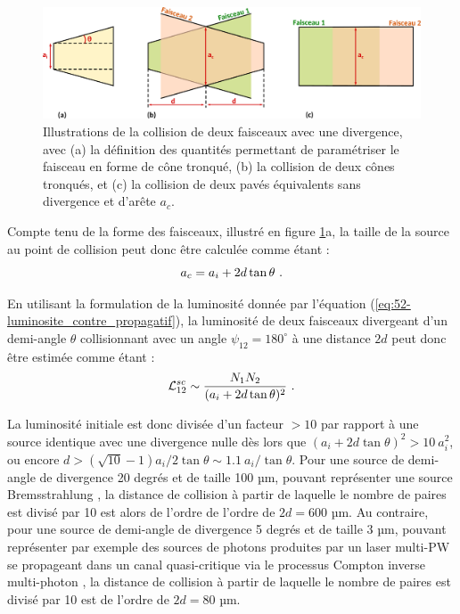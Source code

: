 \begin{refsection}
\begin{figure}[hbtp]
	\centering
	\includegraphics[width=\linewidth]{5-opti_theorique/divergence_luminosite.png}
	\caption{Illustrations de la collision de deux faisceaux avec une divergence, avec (a) la définition des quantités permettant de paramétriser le faisceau en forme de cône tronqué, (b) la collision de deux cônes tronqués, et (c) la collision de deux pavés équivalents sans divergence et d'arête $a_c$.}
	\label{fig:52-luminosite_divergence}
\end{figure}

Compte tenu de la forme des faisceaux, illustré en figure \ref{fig:52-luminosite_divergence}a, la taille de la source au point de collision peut donc être calculée comme étant :
\begin{equation}
    a_c=a_i+2d \tan \theta ~ \rm .
\end{equation}

En utilisant la formulation de la luminosité donnée par l'équation (\ref{eq:52-luminosite_contre_propagatif}), la luminosité de deux faisceaux divergeant d'un demi-angle $\theta$ collisionnant avec un angle $\psi_{12}=180^\circ$ à une distance $2d$ peut donc être estimée comme étant :
\begin{equation}
    \mathcal{L}_{12}^{sc} \sim \dfrac{N_1 N_2}{(a_i+2d\tan\theta)^2} ~ \rm .
    \label{eq:52-luminosite_divergence}
\end{equation}

La luminosité initiale est donc divisée d'un facteur $>10$ par rapport à une source identique avec une divergence nulle dès lors que $(a_i+2d\tan\theta)^2>10 ~ a_i^2$, ou encore $d > (\sqrt{10}-1) a_i/2\tan \theta \sim  1.1 ~ a_i/\tan \theta$. Pour une source de demi-angle de divergence 20 degrés et de taille 100 µm, pouvant représenter une source Bremsstrahlung \parencite{henderson_2014, ben-ismail_2011}, la distance de collision à partir de laquelle le nombre de paires est divisé par 10 est alors de l'ordre de l'ordre de $2d=600$ µm. Au contraire, pour une source de demi-angle de divergence 5 degrés et de taille 3 µm, pouvant représenter par exemple des sources de photons produites par un laser multi-PW se propageant dans un canal quasi-critique via le processus Compton inverse multi-photon \parencite{wang_2020}, la distance de collision à partir de laquelle le nombre de paires est divisé par 10 est de l'ordre de $2d=80$ µm. 


\end{refsection}
